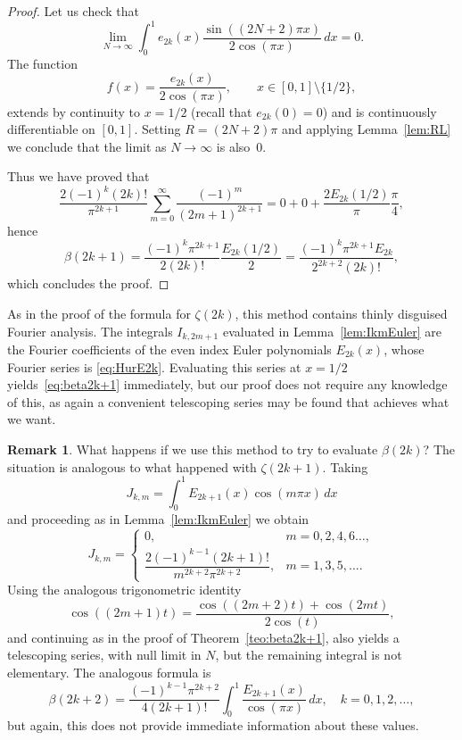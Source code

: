 \documentclass[11pt, oneside]{article}
\theoremstyle{plain}
\theoremstyle{definition}
\newtheorem{remark}[theorem]{Remark}
\begin{document}
\begin{proof}
Let us check that
\[
  \lim_{N \to \infty} \int_0^{1} e_{2k}(x) \frac{\sin((2N+2)\pi x)}{2\cos(\pi x)}\,dx = 0.
\]
The function
\[
  f(x) = \frac{e_{2k}(x)}{2\cos(\pi x)}, \qquad x \in [0,1] \setminus \{1/2\},
\] 
extends by continuity to $x=1/2$ (recall that $e_{2k}(0)=0$) and is continuously differentiable on $[0,1]$. Setting $R = (2N + 2)\pi$ and applying Lemma~\ref{lem:RL} we conclude that the limit as $N \to \infty$ is also~$0$.

Thus we have proved that
\[
\frac{2(-1)^{k}(2k)!}{\pi^{2k+1}} \sum_{m=0}^{\infty} \frac{(-1)^m}{(2m+1)^{2k+1}}
= 0 + 0 + \frac{2E_{2k}(1/2)}{\pi} \frac{\pi}{4},
\]
hence
\[
  \beta(2k+1) = \frac{(-1)^{k}\pi^{2k+1}}{2(2k)!} \frac{E_{2k}(1/2)}{2} 
  = \frac{(-1)^{k}\pi^{2k+1} E_{2k}}{2^{2k+2} (2k)!},
\]
which concludes the proof.
\end{proof}

As in the proof of the formula for $\zeta(2k)$, this method contains thinly disguised Fourier analysis. The integrals $I_{k,2m+1}$ evaluated in Lemma~\ref{lem:IkmEuler} are the Fourier coefficients of the even index Euler polynomials $E_{2k}(x)$, whose Fourier series is \eqref{eq:HurE2k}. Evaluating this series at $x = 1/2$ yields~\eqref{eq:beta2k+1} immediately, but our proof does not require any knowledge of this, as again a convenient telescoping series may be found that achieves what we want.
 
 

\begin{remark}
What happens if we use this method to try to evaluate $\beta(2k)$? The situation is analogous to what happened with $\zeta(2k+1)$. Taking
\[
  J_{k,m} = \int_0^{1} E_{2k+1}(x) \cos(m\pi x)\,dx
\]
and proceeding as in Lemma~\ref{lem:IkmEuler} we obtain
\[
  J_{k,m} = 
  \begin{cases}
  0, & m=0,2,4,6\dots,\\
  \dfrac{2(-1)^{k-1}(2k+1)!}{m^{2k+2} \pi^{2k+2}}, & m=1,3,5,\dots.
  \end{cases}
\]
Using the analogous trigonometric identity
\[
  \cos((2m+1)t) = \frac{\cos((2m+2)t)+\cos(2mt)}{2\cos(t)}, 
\]
and continuing as in the proof of Theorem~\ref{teo:beta2k+1}, also yields a telescoping series, with null limit in $N$, but the remaining integral is not elementary. The analogous formula is
\[
  \beta(2k+2) = \frac{(-1)^{k-1}\pi^{2k+2}}{4(2k+1)!}
  \int_0^{1} \frac{E_{2k+1}(x)}{\cos(\pi x)}\,dx,
  \quad k = 0,1,2,\dots,
\]
but again, this does not provide immediate information about these values.
\end{remark}
\end{document}
